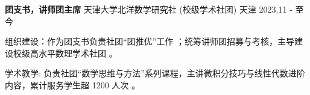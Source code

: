 \vspace{3mm}

\begin{cventries}
  \cventry
    {\textbf{团支书，讲师团主席}} %
    {天津大学北洋数学研究社 (校级学术社团)} %
    {天津} %
    {2023.11 - 至今} %
    {
      \begin{cvitems}
        \item {组织建设：作为团支书负责社团“团推优”工作 ；统筹讲师团招募与考核，主导建设校级高水平数理学术社团 。}
        \item {学术教学: 负责社团“数学思维与方法”系列课程，主讲微积分技巧与线性代数进阶内容，累计服务学生超 1200 人次 。}
      \end{cvitems}
    }
\end{cventries}
